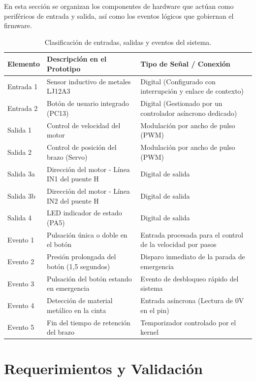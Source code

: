 \documentclass[12pt, letterpaper]{article}
\begin{document}
En esta sección se organizan los componentes de hardware que actúan como periféricos de entrada y salida, así como los eventos lógicos que gobiernan el firmware.

\begin{table}[H]
\centering
\small
\renewcommand{\arraystretch}{1.1}
\caption{Clasificación de entradas, salidas y eventos del sistema.}
\label{tab:entradas_salidas_eventos}
\vspace{0.3cm}
\begin{tabularx}{\textwidth}{lXX}
\toprule
\textbf{Elemento} & \textbf{Descripción en el Prototipo} & \textbf{Tipo de Señal / Conexión} \\
\midrule
Entrada 1         & Sensor inductivo de metales LJ12A3 & Digital (Configurado con interrupción y enlace de contexto) \\
Entrada 2         & Botón de usuario integrado (PC13) & Digital (Gestionado por un controlador asíncrono dedicado) \\
\midrule
Salida 1          & Control de velocidad del motor & Modulación por ancho de pulso (PWM) \\
Salida 2          & Control de posición del brazo (Servo) & Modulación por ancho de pulso (PWM) \\
Salida 3a         & Dirección del motor - Línea IN1 del puente H & Digital de salida \\
Salida 3b         & Dirección del motor - Línea IN2 del puente H & Digital de salida \\
Salida 4          & LED indicador de estado (PA5) & Digital de salida \\
\midrule
Evento 1          & Pulsación única o doble en el botón & Entrada procesada para el control de la velocidad por pasos \\
Evento 2          & Presión prolongada del botón (1,5 segundos) & Disparo inmediato de la parada de emergencia \\
Evento 3          & Pulsación del botón estando en emergencia & Evento de desbloqueo rápido del sistema \\
Evento 4          & Detección de material metálico en la cinta & Entrada asíncrona (Lectura de 0V en el pin) \\
Evento 5          & Fin del tiempo de retención del brazo & Temporizador controlado por el kernel \\
\bottomrule
\end{tabularx}
\end{table}

\section{Requerimientos y Validación}
\label{sec:requerimientos_preliminares}
\end{document}
